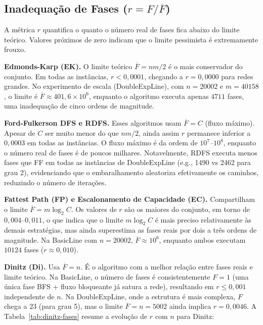 \documentclass{infufrgs}
\begin{document}
\subsection{Inadequação de Fases ($r = F / \overline{F}$)}

A métrica $r$ quantifica o quanto o número real de fases fica abaixo do limite teórico.
Valores próximos de zero indicam que o limite pessimista é extremamente frouxo.

\textbf{Edmonds-Karp (EK).} O limite teórico $\overline{F} = nm/2$ é o mais conservador
do conjunto. Em todas as instâncias, $r < 0{,}0001$, chegando a $r = 0{,}0000$ para
redes grandes. No experimento de escala (DoubleExpLine), com $n = 20002$ e $m = 40158$,
o limite é $\overline{F} \approx 401{,}6 \times 10^6$, enquanto o algoritmo executa
apenas $4711$ fases, uma inadequação de cinco ordens de magnitude.

\textbf{Ford-Fulkerson DFS e RDFS.} Esses algoritmos usam $\overline{F} = C$ (fluxo
máximo). Apesar de $C$ ser muito menor do que $nm/2$, ainda assim $r$ permanece
inferior a $0{,}0003$ em todas as instâncias. O fluxo máximo é da ordem de $10^7$--$10^8$,
enquanto o número real de fases é de poucos milhares. Notavelmente, RDFS executa menos
fases que FF em todas as instâncias de DoubleExpLine (e.g., 1490 vs 2462 para grau 2),
evidenciando que o embaralhamento aleatoriza efetivamente os caminhos, reduzindo o
número de iterações.

\textbf{Fattest Path (FP) e Escalonamento de Capacidade (EC).} Compartilham o limite
$\overline{F} = m \log_2 C$. Os valores de $r$ são os maiores do conjunto, em torno de
$0{,}004$--$0{,}011$, o que indica que o limite $m \log_2 C$ é mais preciso
relativamente às demais estratégias, mas ainda superestima as fases reais por dois
a três ordens de magnitude. Na BasicLine com $n = 20002$, $\overline{F} \approx 10^6$,
enquanto ambos executam $10124$ fases ($r \approx 0{,}010$).

\textbf{Dinitz (Di).} Usa $\overline{F} = n$. É o algoritmo com a melhor relação entre
fases reais e limite teórico. Na BasicLine, o número de fases é consistentemente
$F = 1$ (uma única fase BFS + fluxo bloqueante já satura a rede), resultando em
$r \leq 0{,}001$ independente de $n$. Na DoubleExpLine, onde a estrutura é mais
complexa, $F$ chega a $23$ (para grau 5), mas o limite $\overline{F} = n = 5002$
ainda implica $r = 0{,}0046$. A Tabela~\ref{tab:dinitz-fases} resume a evolução de $r$ com $n$ para Dinitz:
\end{document}
